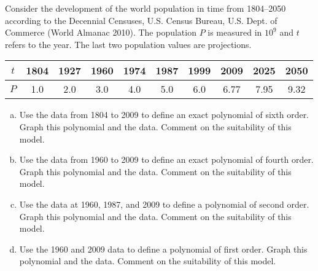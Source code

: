 \documentclass[xcolor=svgnames, t]{beamer}
\theoremstyle{definition}
\theoremstyle{plain}
\theoremstyle{remark}
\begin{document}
\begin{frame}[allowframebreaks]
	Consider the development of the world population in time from 1804--2050 according to the Decennial Censuses, U.S. Census Bureau, U.S. Dept. of Commerce (World Almanac 2010). The population $P$ is measured in $10^9$ and $t$ refers to the year. The last two population values are projections.

\begin{table}[h]
\centering
\begin{tabular}{cccccccccc}
\hline
$t$ & 1804 & 1927 & 1960 & 1974 & 1987 & 1999 & 2009 & 2025 & 2050 \\
\hline
$P$ & 1.0 & 2.0 & 3.0 & 4.0 & 5.0 & 6.0 & 6.77 & 7.95 & 9.32 \\
\hline
\end{tabular}
\end{table}

\begin{enumerate}[a)]
\item Use the data from 1804 to 2009 to define an exact polynomial of sixth order. Graph this polynomial and the data. Comment on the suitability of this model.

\item Use the data from 1960 to 2009 to define an exact polynomial of fourth order. Graph this polynomial and the data. Comment on the suitability of this model.

\item Use the data at 1960, 1987, and 2009 to define a polynomial of second order. Graph this polynomial and the data. Comment on the suitability of this model.

\item Use the 1960 and 2009 data to define a polynomial of first order. Graph this polynomial and the data. Comment on the suitability of this model.
\end{enumerate}
\end{frame}
\end{document}
